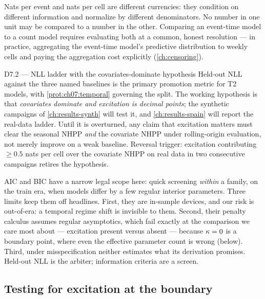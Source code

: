 \begin{warning}\label{warn:ch07:units}
Nats per event and nats per cell are different currencies: they condition
on different information and normalize by different denominators. No
number in one unit may be compared to a number in the other. Comparing an
event-time model to a count model requires evaluating both at a common,
honest resolution --- in practice, aggregating the event-time model's
predictive distribution to weekly cells and paying the aggregation cost
explicitly (\cref{ch:censoring}).
\end{warning}

\begin{decision}{D7.2 --- NLL ladder with the covariates-dominate hypothesis}
Held-out NLL against the three named baselines is the primary promotion
metric for T2 models, with \cref{prot:ch07:temporal} governing the split.
The working hypothesis is that \emph{covariates dominate and excitation is
decimal points}; the synthetic campaigns of \cref{ch:results-synth} will
test it, and \cref{ch:results-spain} will report the real-data ladder.
Until it is overturned, any claim that excitation matters must clear the
seasonal NHPP \emph{and} the covariate NHPP under rolling-origin
evaluation, not merely improve on a weak baseline. Reversal trigger:
excitation contributing $\ge 0.5$ nats per cell over the covariate NHPP on
real data in two consecutive campaigns retires the hypothesis.
\end{decision}

AIC and BIC have a narrow legal scope here: quick screening \emph{within}
a family, on the train era, when models differ by a few regular interior
parameters. Three limits keep them off headlines. First, they are
in-sample devices, and our risk is out-of-era: a temporal regime shift is
invisible to them. Second, their penalty calculus assumes regular
asymptotics, which fail exactly at the comparison we care most about ---
excitation present versus absent --- because $\kappa=0$ is a boundary
point, where even the effective parameter count is wrong (below). Third,
under misspecification neither estimates what its derivation promises.
Held-out NLL is the arbiter; information criteria are a screen.

\subsection{Testing for excitation at the boundary}\label{ch07:sec:boundary}

